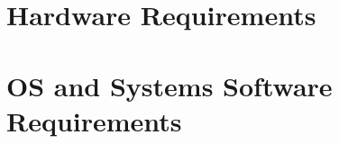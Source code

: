 \documentclass{article}
\begin{document}
\section*{Hardware Requirements}

\section*{OS and Systems Software Requirements}
\end{document}
